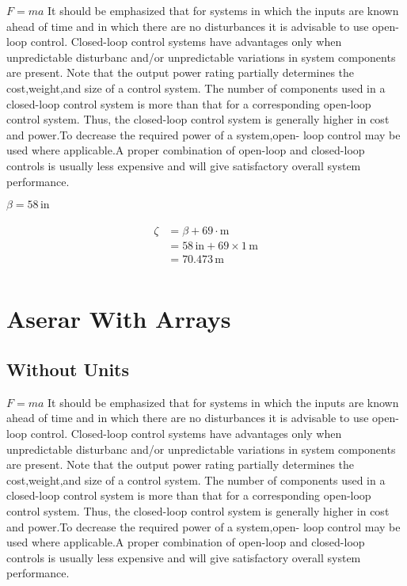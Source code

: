 \documentclass{report}
\begin{document}
$F = ma$ It should be emphasized that for systems in which the inputs are known ahead of time and in which there are no disturbances it is advisable to use open-loop control.  Closed-loop control systems have advantages only when unpredictable disturbanc  and/or unpredictable variations in system components are present. Note that the  output power rating partially determines the cost,weight,and size of a control system.  The number of components used in a closed-loop control system is more than that for  a corresponding open-loop control system. Thus, the closed-loop control system is generally higher in cost and power.To decrease the required power of a system,open-  loop control may be used where applicable.A proper combination of open-loop and  closed-loop controls is usually less expensive and will give satisfactory overall system  performance.

$\beta = 58\,\mathrm{in}$ 

\begin{align}
\begin{split}
\zeta	&= \beta + 69 \cdot \mathrm{m}\\
		&= 58\,\mathrm{in} + 69 \times 1\,\mathrm{m}\\
		&= 70.473\,\mathrm{m}\\
\end{split}
\end{align}

\chapter{Aserar With Arrays}
\section{Without Units}

$F = ma$ It should be emphasized that for systems in which the inputs are known ahead of time and in which there are no disturbances it is advisable to use open-loop control.  Closed-loop control systems have advantages only when unpredictable disturbanc  and/or unpredictable variations in system components are present. Note that the  output power rating partially determines the cost,weight,and size of a control system.  The number of components used in a closed-loop control system is more than that for  a corresponding open-loop control system. Thus, the closed-loop control system is generally higher in cost and power.To decrease the required power of a system,open-  loop control may be used where applicable.A proper combination of open-loop and  closed-loop controls is usually less expensive and will give satisfactory overall system  performance.
\end{document}
